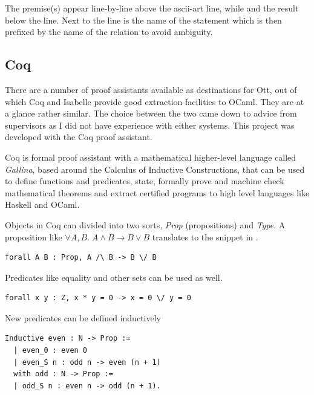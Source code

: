 \documentclass[12pt,twoside,notitlepage]{report}
\begin{document}
The premise(s) appear line-by-line above the ascii-art line, while and the result below the line. Next to the line is the name of the statement which is then prefixed by the name of the relation to avoid ambiguity. 



\subsection{Coq}
There are a number of proof assistants available as destinations for Ott, out of which Coq and Isabelle provide good extraction facilities to OCaml. They are at a glance rather similar. The choice between the two came down to advice from supervisors as I did not have experience with either systems. This project was developed with the Coq proof assistant. 

Coq is formal proof assistant with a mathematical higher-level language called \textit{Gallina}, based around the Calculus of Inductive Constructions, that can be used to define functions and predicates, state, formally prove and machine check mathematical theorems and extract certified programs to high level languages like Haskell and OCaml.

Objects in Coq can divided into two sorts, \textit{Prop} (propositions) and \textit{Type}. A proposition like $ \forall A, B.\; A \wedge B \rightarrow B \vee B $ translates to the snippet in .


\begin{lstlisting}[language={Coq},caption={Coq Prop logic example},label={lst:coqproplogex}]
forall A B : Prop, A /\ B -> B \/ B
\end{lstlisting}


Predicates like equality and other sets can be used as well.


\begin{lstlisting}[language={Coq},caption={Coq Prop predicate example}]
forall x y : Z, x * y = 0 -> x = 0 \/ y = 0
\end{lstlisting}


New predicates can be defined inductively


\begin{lstlisting}[language={Coq},caption={Coq Prop new predicate example}]
 Inductive even : N -> Prop :=
  | even_0 : even 0
  | even_S n : odd n -> even (n + 1)
  with odd : N -> Prop :=
  | odd_S n : even n -> odd (n + 1).
\end{lstlisting}
\end{document}
